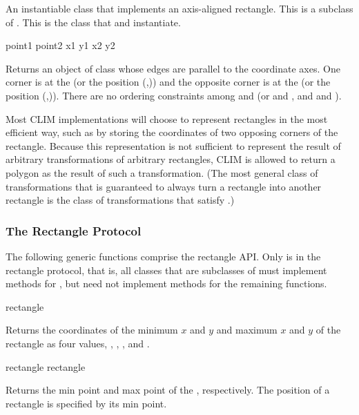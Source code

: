 An instantiable class that implements an axis-aligned rectangle.  This is a
subclass of .  This is the class that  and
 instantiate.
\Immutable

  {point1 point2}
 {x1 y1 x2 y2}

Returns an object of class  whose edges are parallel to
the coordinate axes.  One corner is at the   (or the
position (,)) and the opposite corner is at the 
 (or the position (,)).  There are no ordering
constraints among  and  (or  and , and
 and ).

Most CLIM implementations will choose to represent rectangles in the most
efficient way, such as by storing the coordinates of two opposing corners of the
rectangle.  Because this representation is not sufficient to represent the
result of arbitrary transformations of arbitrary rectangles, CLIM is allowed to
return a polygon as the result of such a transformation.  (The most general
class of transformations that is guaranteed to always turn a rectangle into
another rectangle is the class of transformations that satisfy
.)

\MayCaptureInputs


\subsubsection {The Rectangle Protocol}

The following generic functions comprise the rectangle API.  Only
 is in the rectangle protocol, that is, all classes that
are subclasses of  must implement methods for
, but need not implement methods for the remaining
functions.

 {rectangle}

Returns the coordinates of the minimum $x$ and $y$ and maximum $x$ and $y$ of
the rectangle  as four values, , ,
, and .

 {rectangle}
 {rectangle}

Returns the min point and max point of the  ,
respectively.  The position of a rectangle is specified by its min point.

